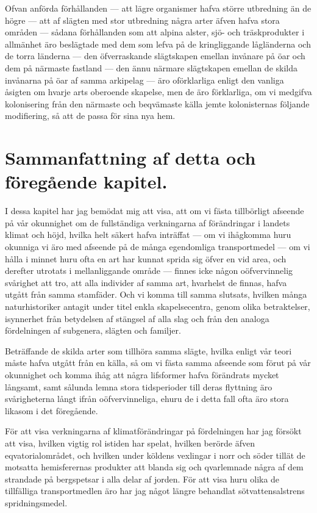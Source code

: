 Ofvan anförda förhållanden — att lägre organismer hafva större utbredning än de högre — att af slägten med stor utbredning några arter äfven hafva stora områden — sådana förhållanden som att alpina alster, sjö- och träskprodukter i allmänhet äro beslägtade med dem som lefva på de kringliggande lågländerna och de torra länderna — den öfverraskande slägtskapen emellan invånare på öar och dem på närmaste fastland — den ännu närmare slägtskapen emellan de skilda invånarna på öar af samma arkipelag — äro oförklarliga enligt den vanliga åsigten om hvarje arts oberoende skapelse, men de äro förklarliga, om vi medgifva kolonisering från den närmaste och beqvämaste källa jemte kolonisternas följande modifiering, så att de passa för sina nya hem.



\section[Sammanfattning]{Sammanfattning af detta och föregående kapitel.}

I dessa kapitel har jag bemödat mig att visa, att om vi fästa tillbörligt afseende på vår okunnighet om de fullständiga verkningarna af förändringar i landets klimat och höjd, hvilka helt säkert hafva inträffat — om vi ihågkomma huru okunniga vi äro med afseende på de många egendomliga transportmedel — om vi hålla i minnet huru ofta en art har kunnat sprida sig öfver en vid area, och derefter utrotats i mellanliggande område — finnes icke någon oöfvervinnelig svårighet att tro, att alla individer af samma art, hvarhelst de finnas, hafva utgått från samma stamfäder. Och vi komma till samma slutsats, hvilken många naturhistoriker antagit under titel enkla skapelsecentra, genom olika betraktelser, isynnerhet från betydelsen af stängsel af alla slag och från den analoga fördelningen af subgenera, slägten och familjer.

Beträffande de skilda arter som tillhöra samma slägte, hvilka enligt vår teori måste hafva utgått från en källa, så om vi fästa samma afseende som förut på vår okunnighet och komma ihåg att några lifsformer hafva förändrats mycket långsamt, samt sålunda lemna stora tidsperioder till deras flyttning äro svårigheterna långt ifrån oöfvervinneliga, ehuru de i detta fall ofta äro stora likasom i det föregående.

För att visa verkningarna af klimatförändringar på fördelningen har jag försökt att visa, hvilken vigtig rol istiden har spelat, hvilken berörde äfven eqvatorialområdet, och hvilken under köldens vexlingar i norr och söder tillät de motsatta hemisferernas produkter att blanda sig och qvarlemnade några af dem strandade på bergspetsar i alla delar af jorden. För att visa huru olika de tillfälliga transportmedlen äro har jag något längre behandlat sötvattensalstrens spridningsmedel.

